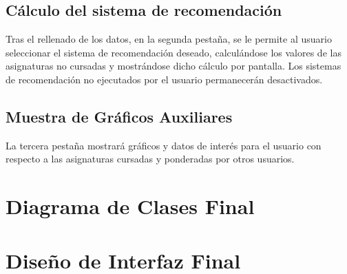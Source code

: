 \subsection{Cálculo del sistema de recomendación}
Tras el rellenado de los datos, en la segunda pestaña, se le permite al usuario seleccionar el sistema de recomendación deseado, calculándose los valores de las asignaturas no cursadas y mostrándose dicho cálculo por pantalla. Los sistemas de recomendación no ejecutados por el usuario permanecerán desactivados. 
\subsection{Muestra de Gráficos Auxiliares}
La tercera pestaña mostrará gráficos y datos de interés para el usuario con respecto a las asignaturas cursadas y ponderadas por otros usuarios. 


\section{Diagrama de Clases Final}

\section{Diseño de Interfaz Final}